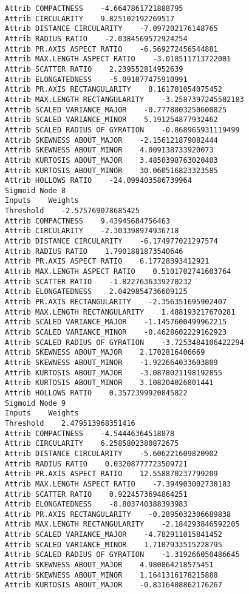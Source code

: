\documentclass[
	article,			%
	11pt,				%
	oneside,			%
	a4paper,			%
	english,			%
	brazil,				%
	sumario=tradicional
	]{abntex2}
\begin{document}
\begin{lstlisting}
Attrib COMPACTNESS    -4.6647861721888795
Attrib CIRCULARITY    9.825102192269517
Attrib DISTANCE CIRCULARITY    -7.097202176148765
Attrib RADIUS RATIO    -2.0384569572924254
Attrib PR.AXIS ASPECT RATIO    -6.569272456544881
Attrib MAX.LENGTH ASPECT RATIO    -3.018511713722001
Attrib SCATTER RATIO    2.239552814952639
Attrib ELONGATEDNESS    -5.091077475910991
Attrib PR.AXIS RECTANGULARITY    8.161701054075452
Attrib MAX.LENGTH RECTANGULARITY    -3.2587397245502183
Attrib SCALED VARIANCE_MAJOR    -0.7778803250600825
Attrib SCALED VARIANCE_MINOR    5.191254877932462
Attrib SCALED RADIUS OF GYRATION    -0.868965931119499
Attrib SKEWNESS ABOUT_MAJOR    -2.156121879082444
Attrib SKEWNESS ABOUT_MINOR    4.009138733920073
Attrib KURTOSIS ABOUT_MAJOR    3.4850398763020403
Attrib KURTOSIS ABOUT_MINOR    30.060516823323585
Attrib HOLLOWS RATIO    -24.099403586739964
Sigmoid Node 8
Inputs    Weights
Threshold    -2.575769078685425
Attrib COMPACTNESS    9.43945684756463
Attrib CIRCULARITY    -2.303398974936718
Attrib DISTANCE CIRCULARITY    -6.174977021297574
Attrib RADIUS RATIO    1.7901881873540646
Attrib PR.AXIS ASPECT RATIO    6.17728393412921
Attrib MAX.LENGTH ASPECT RATIO    0.5101702741603764
Attrib SCATTER RATIO    -1.8227636339270232
Attrib ELONGATEDNESS    2.0429854736609125
Attrib PR.AXIS RECTANGULARITY    -2.356351695902407
Attrib MAX.LENGTH RECTANGULARITY    1.488193217670281
Attrib SCALED VARIANCE_MAJOR    -1.1457600499962215
Attrib SCALED VARIANCE_MINOR    -0.4628602229162923
Attrib SCALED RADIUS OF GYRATION    -3.7253484106422294
Attrib SKEWNESS ABOUT_MAJOR    2.1702816406669
Attrib SKEWNESS ABOUT_MINOR    -1.922664033603809
Attrib KURTOSIS ABOUT_MAJOR    -3.0878021198192855
Attrib KURTOSIS ABOUT_MINOR    3.108204026801441
Attrib HOLLOWS RATIO    0.3572399920845822
Sigmoid Node 9
Inputs    Weights
Threshold    2.479513968351416
Attrib COMPACTNESS    -4.54446364518878
Attrib CIRCULARITY    6.2585802380872675
Attrib DISTANCE CIRCULARITY    -5.606221609820902
Attrib RADIUS RATIO    0.03208777723509721
Attrib PR.AXIS ASPECT RATIO    12.558870237799209
Attrib MAX.LENGTH ASPECT RATIO    -7.394903002738183
Attrib SCATTER RATIO    0.9224573694864251
Attrib ELONGATEDNESS    -8.803740388393983
Attrib PR.AXIS RECTANGULARITY    -0.2895032306689838
Attrib MAX.LENGTH RECTANGULARITY    -2.184293846592205
Attrib SCALED VARIANCE_MAJOR    -4.782911015841452
Attrib SCALED VARIANCE_MINOR    1.7107933515228795
Attrib SCALED RADIUS OF GYRATION    -1.319266050486645
Attrib SKEWNESS ABOUT_MAJOR    4.980864218575451
Attrib SKEWNESS ABOUT_MINOR    1.1641316178215888
Attrib KURTOSIS ABOUT_MAJOR    -0.8316408862176267

\end{lstlisting}
\end{document}
